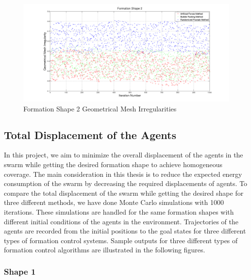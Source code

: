 \begin{figure}[H]
\caption{Formation Shape 2 Geometrical Mesh Irregularities} \label{geometric_ref_2}
\centerline{\includegraphics[scale = 0.32]{Geometrical_Irr_2}}
\end{figure} 	
		
\subsection{Total Displacement of the Agents}  \label{total_dist_ref}
		
In this project, we aim to minimize the overall displacement of the agents in the swarm while getting the desired formation shape to achieve homogeneous coverage. The main consideration in this thesis is to reduce the expected energy consumption of the swarm by decreasing the required displacements of agents. To compare the total displacement of the swarm while getting the desired shape for three different methods, we have done Monte Carlo simulations with 1000 iterations. These simulations are handled for the same formation shapes with different initial conditions of the agents in the environment. Trajectories of the agents are recorded from the initial positions to the goal states for three different types of formation control systems. Sample outputs for three different types of formation control algorithms are illustrated in the following figures.
		
\newpage
\subsubsection{Shape 1}\hspace{0pt} \\
		
